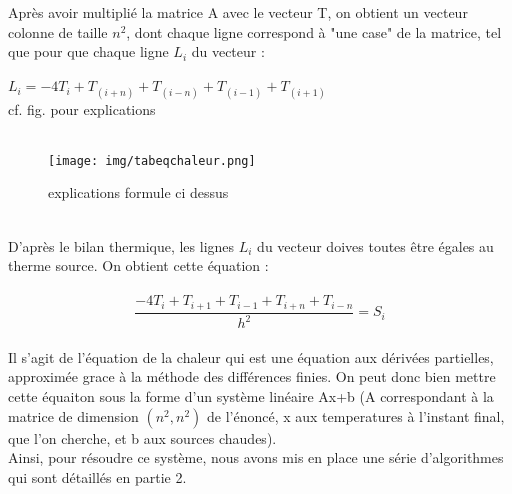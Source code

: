 Après avoir multiplié la matrice A avec le vecteur T, on obtient un vecteur colonne de taille $n^2$, dont chaque ligne correspond à "une case" de la matrice, tel que pour que chaque ligne $L_i$ du vecteur : 
\\
\\
$L_i = -4T_i + T_(i+n) + T_(i-n) + T_(i-1) + T_(i+1)$
\\cf. fig. pour explications
\\
\\
\begin{figure}
    \centering
    \texttt{[image: img/tabeqchaleur.png]}
    \caption{explications formule ci dessus}
    
\end{figure}
\\
\newpage
D'après le bilan thermique, les lignes $L_i$ du vecteur doives toutes être égales au therme source. On obtient cette équation : 
\\
\\
$$\frac{-4T_i + T_{i+1} + T_{i-1} + T_{i+n} + T_{i-n}}{h^2} = S_i$$
\\

Il s'agit de l'équation de la chaleur qui est une équation aux dérivées partielles, approximée grace à la méthode des différences finies. On peut donc bien mettre cette équaiton sous la forme d'un système linéaire Ax+b (A correspondant à la matrice de dimension $(n^2, n^2)$ de l'énoncé, x aux temperatures à l'instant final, que l'on cherche, et b aux sources chaudes). 
\\
Ainsi, pour résoudre ce système, nous avons mis en place une série d'algorithmes qui sont détaillés en partie 2. 



